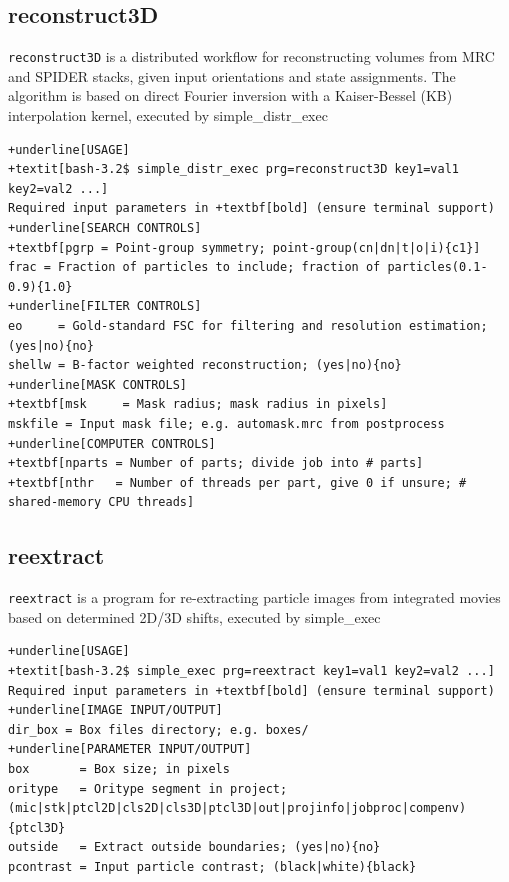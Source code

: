 \documentclass[a4paper,11pt]{article}
\newcommand{\prgname}[1]{\textcolor{NavyBlue}{\texttt{#1}}}
\begin{document}
\subsection{reconstruct3D}
\label{reconstruct3D}
\prgname{reconstruct3D} is a distributed workflow for reconstructing volumes from MRC and SPIDER stacks, given input orientations and state assignments. The algorithm is based on direct Fourier inversion with a Kaiser-Bessel (KB) interpolation kernel, executed by simple\_distr\_exec
\begin{Verbatim}[commandchars=+\[\],fontsize=\small,breaklines=true]
+underline[USAGE]
+textit[bash-3.2$ simple_distr_exec prg=reconstruct3D key1=val1 key2=val2 ...]
Required input parameters in +textbf[bold] (ensure terminal support)
+underline[SEARCH CONTROLS]
+textbf[pgrp = Point-group symmetry; point-group(cn|dn|t|o|i){c1}]
frac = Fraction of particles to include; fraction of particles(0.1-0.9){1.0}
+underline[FILTER CONTROLS]
eo     = Gold-standard FSC for filtering and resolution estimation; (yes|no){no}
shellw = B-factor weighted reconstruction; (yes|no){no}
+underline[MASK CONTROLS]
+textbf[msk     = Mask radius; mask radius in pixels]
mskfile = Input mask file; e.g. automask.mrc from postprocess
+underline[COMPUTER CONTROLS]
+textbf[nparts = Number of parts; divide job into # parts]
+textbf[nthr   = Number of threads per part, give 0 if unsure; # shared-memory CPU threads]
\end{Verbatim}

\subsection{reextract}
\label{reextract}
\prgname{reextract} is a program for re-extracting particle images from integrated movies based on determined 2D/3D shifts, executed by simple\_exec
\begin{Verbatim}[commandchars=+\[\],fontsize=\small,breaklines=true]
+underline[USAGE]
+textit[bash-3.2$ simple_exec prg=reextract key1=val1 key2=val2 ...]
Required input parameters in +textbf[bold] (ensure terminal support)
+underline[IMAGE INPUT/OUTPUT]
dir_box = Box files directory; e.g. boxes/
+underline[PARAMETER INPUT/OUTPUT]
box       = Box size; in pixels
oritype   = Oritype segment in project; (mic|stk|ptcl2D|cls2D|cls3D|ptcl3D|out|projinfo|jobproc|compenv){ptcl3D}
outside   = Extract outside boundaries; (yes|no){no}
pcontrast = Input particle contrast; (black|white){black}
\end{Verbatim}
\end{document}

